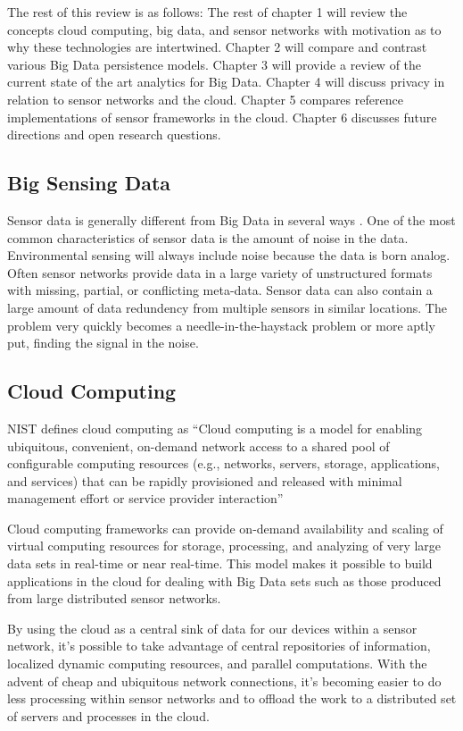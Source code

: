 \documentclass[twocolumn]{article}
\begin{document}
The rest of this review is as follows: The rest of chapter 1 will review the concepts cloud computing, big data, and sensor networks with motivation as to why these technologies are intertwined. Chapter 2 will compare and contrast various Big Data persistence models. Chapter 3 will provide a review of the current state of the art analytics for Big Data. Chapter 4 will discuss privacy in relation to sensor networks and the cloud. Chapter 5 compares reference implementations of sensor frameworks in the cloud. Chapter 6 discusses future directions and open research questions.

\subsection{Big Sensing Data}
Sensor data is generally different from Big Data in several ways \cite{chen_big_2014}. One of the most common characteristics of sensor data is the amount of noise in the data. Environmental sensing will always include noise because the data is born analog\cite{pcast}. Often sensor networks provide data in a large variety of unstructured formats with missing, partial, or conflicting meta-data. Sensor data can also contain a large amount of data redundency from multiple sensors in similar locations. The problem very quickly becomes a needle-in-the-haystack problem or more aptly put, finding the signal in the noise.

\subsection{Cloud Computing}
NIST\cite{mell2011nist} defines cloud computing as ``Cloud computing is a model for enabling ubiquitous, convenient, on-demand network access to a shared pool of configurable computing resources (e.g., networks, servers, storage, applications, and services) that can be rapidly provisioned and released with minimal management effort or service provider interaction''

Cloud computing frameworks can provide on-demand availability and scaling of virtual computing resources for storage, processing, and analyzing of very large data sets in real-time or near real-time. This model makes it possible to build applications in the cloud for dealing with Big Data sets such as those produced from large distributed sensor networks.

By using the cloud as a central sink of data for our devices within a sensor network, it's possible to take advantage of central repositories of information, localized dynamic computing resources, and parallel computations.  With the advent of cheap and ubiquitous network connections, it's becoming easier to do less processing within sensor networks and to offload the work to a distributed set of servers and processes in the cloud\cite{kamburugamuve_framework_2015}.
\end{document}
